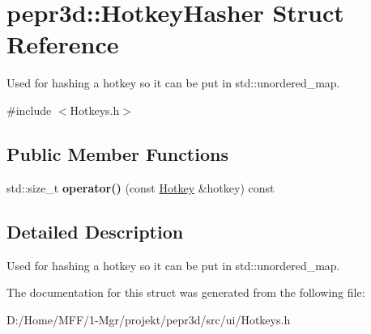 \hypertarget{structpepr3d_1_1_hotkey_hasher}{}\section{pepr3d\+::Hotkey\+Hasher Struct Reference}
\label{structpepr3d_1_1_hotkey_hasher}


Used for hashing a hotkey so it can be put in std\+::unordered\+\_\+map.  




{\ttfamily \#include $<$Hotkeys.\+h$>$}

\subsection*{Public Member Functions}
\begin{DoxyCompactItemize}
\item 
\mbox{\label{structpepr3d_1_1_hotkey_hasher_a009c1c39bddad8bd3379b793411e1145}} 
std\+::size\+\_\+t {\bfseries operator()} (const \mbox{\hyperlink{structpepr3d_1_1_hotkey}{Hotkey}} \&hotkey) const
\end{DoxyCompactItemize}


\subsection{Detailed Description}
Used for hashing a hotkey so it can be put in std\+::unordered\+\_\+map. 

The documentation for this struct was generated from the following file\+:\begin{DoxyCompactItemize}
\item 
D\+:/\+Home/\+M\+F\+F/1-\/\+Mgr/projekt/pepr3d/src/ui/Hotkeys.\+h\end{DoxyCompactItemize}
